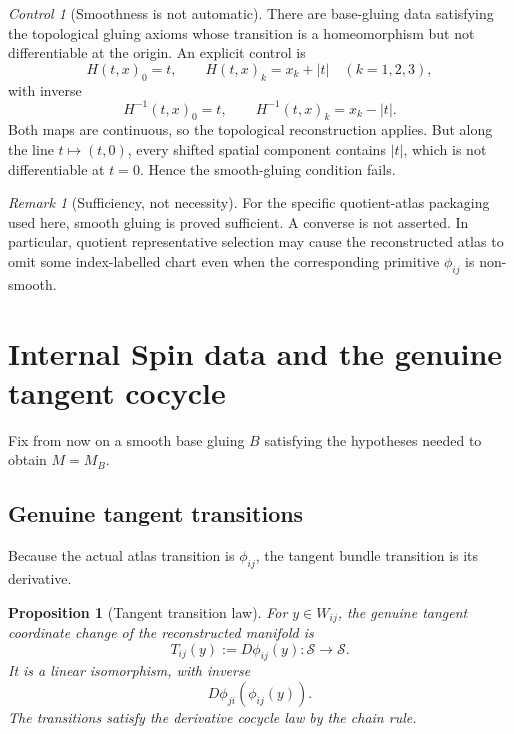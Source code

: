 \documentclass[11pt,a4paper]{article}
\newtheorem{proposition}[theorem]{Proposition}
\theoremstyle{definition}
\theoremstyle{remark}
\newtheorem{remark}[theorem]{Remark}
\newtheorem{control}[theorem]{Control}
\newcommand{\Smodel}{\mathcal{S}}
\begin{document}
\begin{control}[Smoothness is not automatic]
\label{control:nonsmooth}
There are base-gluing data satisfying the topological gluing axioms whose
transition is a homeomorphism but not differentiable at the origin.  An
explicit control is
\[
   H(t,x)_0=t,
   \qquad
   H(t,x)_k=x_k+|t| \quad(k=1,2,3),
\]
with inverse
\[
   H^{-1}(t,x)_0=t,
   \qquad
   H^{-1}(t,x)_k=x_k-|t|.
\]
Both maps are continuous, so the topological reconstruction applies.  But
along the line \(t\mapsto(t,0)\), every shifted spatial component contains
\(|t|\), which is not differentiable at \(t=0\).  Hence the smooth-gluing
condition fails.
\end{control}

\begin{remark}[Sufficiency, not necessity]
\label{rem:smooth-sufficient}
For the specific quotient-atlas packaging used here, smooth gluing is
proved sufficient.  A converse is not asserted.  In particular, quotient
representative selection may cause the reconstructed atlas to omit some
index-labelled chart even when the corresponding primitive
\(\phi_{ij}\) is non-smooth.
\end{remark}

\clearpage
\section{Internal Spin data and the genuine tangent cocycle}
\label{sec:tangent}

Fix from now on a smooth base gluing \(B\) satisfying the hypotheses needed
to obtain \(M=M_B\).

\subsection{Genuine tangent transitions}

Because the actual atlas transition is \(\phi_{ij}\), the tangent bundle
transition is its derivative.

\begin{proposition}[Tangent transition law]
\label{prop:tangent-transition}
For \(y\in W_{ij}\), the genuine tangent coordinate change of the
reconstructed manifold is
\[
   T_{ij}(y):=D\phi_{ij}(y):
   \Smodel\longrightarrow\Smodel.
\tag{6.1}\label{eq:tangent-transition}
\]
It is a linear isomorphism, with inverse
\[
   D\phi_{ji}(\phi_{ij}(y)).
\tag{6.2}\label{eq:tangent-inverse}
\]
The transitions satisfy the derivative cocycle law by the chain rule.
\end{proposition}
\end{document}

